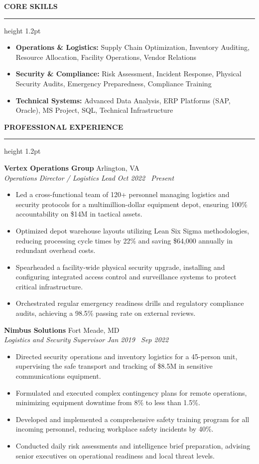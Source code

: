 \documentclass[10pt,letterpaper]{article}
\newcommand{\resumesection}[1]{%
  \vspace{7pt}%
  {\color{primarycolor}\bfseries\large\MakeUppercase{#1}}\par%
  \vspace{1.5pt}%
  {\color{accentcolor}\hrule height 1.2pt}\par%
  \vspace{4.5pt}%
}
\begin{document}
\resumesection{Core Skills}
\begin{itemize}[leftmargin=10pt,nosep]
    \item \textbf{Operations \& Logistics:} Supply Chain Optimization, Inventory Auditing, Resource Allocation, Facility Operations, Vendor Relations
    \item \textbf{Security \& Compliance:} Risk Assessment, Incident Response, Physical Security Audits, Emergency Preparedness, Compliance Training
    \item \textbf{Technical Systems:} Advanced Data Analysis, ERP Platforms (SAP, Oracle), MS Project, SQL, Technical Infrastructure
\end{itemize}

\resumesection{Professional Experience}

\textbf{Vertex Operations Group} \hfill Arlington, VA \\
\textit{Operations Director / Logistics Lead} \hfill \textit{Oct 2022 \textendash\ Present}
\begin{itemize}[leftmargin=10pt,nosep,topsep=2pt]
    \item Led a cross-functional team of 120+ personnel managing logistics and security protocols for a multimillion-dollar equipment depot, ensuring 100\% accountability on \$14M in tactical assets.
    \item Optimized depot warehouse layouts utilizing Lean Six Sigma methodologies, reducing processing cycle times by 22\% and saving \$64,000 annually in redundant overhead costs.
    \item Spearheaded a facility-wide physical security upgrade, installing and configuring integrated access control and surveillance systems to protect critical infrastructure.
    \item Orchestrated regular emergency readiness drills and regulatory compliance audits, achieving a 98.5\% passing rate on external reviews.
\end{itemize}

\vspace{6pt}

\textbf{Nimbus Solutions} \hfill Fort Meade, MD \\
\textit{Logistics and Security Supervisor} \hfill \textit{Jan 2019 \textendash\ Sep 2022}
\begin{itemize}[leftmargin=10pt,nosep,topsep=2pt]
    \item Directed security operations and inventory logistics for a 45-person unit, supervising the safe transport and tracking of \$8.5M in sensitive communications equipment.
    \item Formulated and executed complex contingency plans for remote operations, minimizing equipment downtime from 8\% to less than 1.5\%.
    \item Developed and implemented a comprehensive safety training program for all incoming personnel, reducing workplace safety incidents by 40\%.
    \item Conducted daily risk assessments and intelligence brief preparation, advising senior executives on operational readiness and local threat levels.
\end{itemize}
\end{document}
